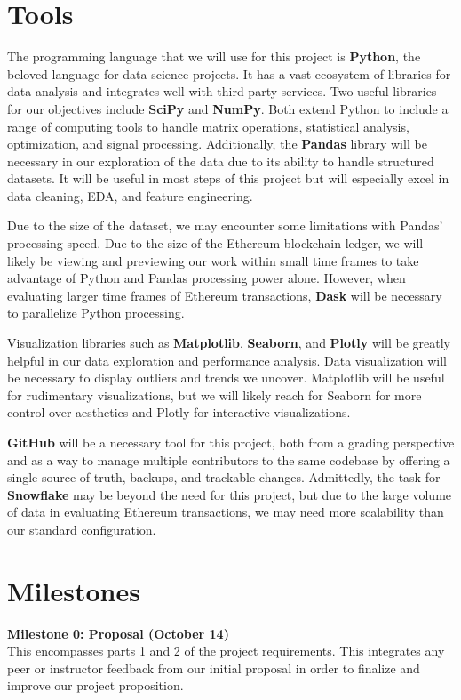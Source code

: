 \documentclass[sigconf]{acmart}
\begin{document}
\section{Tools}

The programming language that we will use for this project is \textbf{Python}, the beloved language for data science projects. It has a vast ecosystem of libraries for data analysis and integrates well with third-party services. Two useful libraries for our objectives include \textbf{SciPy} and \textbf{NumPy}. Both extend Python to include a range of computing tools to handle matrix operations, statistical analysis, optimization, and signal processing. Additionally, the \textbf{Pandas} library will be necessary in our exploration of the data due to its ability to handle structured datasets. It will be useful in most steps of this project but will especially excel in data cleaning, EDA, and feature engineering.

Due to the size of the dataset, we may encounter some limitations with Pandas’ processing speed. Due to the size of the Ethereum blockchain ledger, we will likely be viewing and previewing our work within small time frames to take advantage of Python and Pandas processing power alone. However, when evaluating larger time frames of Ethereum transactions, \textbf{Dask} will be necessary to parallelize Python processing.

Visualization libraries such as \textbf{Matplotlib}, \textbf{Seaborn}, and \textbf{Plotly} will be greatly helpful in our data exploration and performance analysis. Data visualization will be necessary to display outliers and trends we uncover. Matplotlib will be useful for rudimentary visualizations, but we will likely reach for Seaborn for more control over aesthetics and Plotly for interactive visualizations.

\textbf{GitHub} will be a necessary tool for this project, both from a grading perspective and as a way to manage multiple contributors to the same codebase by offering a single source of truth, backups, and trackable changes. Admittedly, the task for \textbf{Snowflake} may be beyond the need for this project, but due to the large volume of data in evaluating Ethereum transactions, we may need more scalability than our standard configuration.

\section{Milestones}
\textbf{Milestone 0: Proposal (October 14)}\\
This encompasses parts 1 and 2 of the project requirements. This integrates any peer or instructor feedback from our initial proposal in order to finalize and improve our project proposition.
\end{document}

